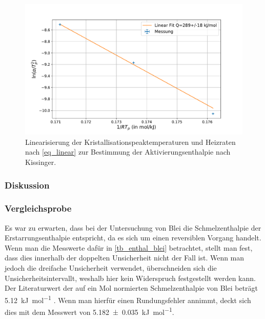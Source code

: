 \documentclass[
	a4paper,
	12pt,
	pagesize,
	ngerman
]{scrartcl}
\begin{document}
\begin{figure}[H]
			\includegraphics[width=\linewidth]{img/Kalorimetrie_kissinger.pdf}
			\caption{
			Linearisierung der Kristallisationspeaktemperaturen und Heizraten nach \cref{eq_linear} zur Bestimmung der Aktivierungsenthalpie nach Kissinger.
			}
			\label{fig_thermo_kissinger}
		\end{figure}


	\subsubsection{Diskussion}

	\subsubsection*{Vergleichsprobe}
	Es war zu erwarten, dass bei der Untersuchung von Blei die Schmelzenthalpie der Erstarrungsenthalpie entspricht, da es sich um einen reversiblen Vorgang handelt.
	Wenn man die Messwerte dafür in \cref{tb_enthal_blei} betrachtet, stellt man fest, dass dies innerhalb der doppelten Unsicherheit nicht der Fall ist.
	Wenn man jedoch die dreifache Unsicherheit verwendet, überschneiden sich die Unsicherheitsintervallt, weshalb hier kein Widerspruch festgestellt werden kann.
	Der Literaturwert der auf ein Mol normierten Schmelzenthalpie von Blei beträgt \SI{5.12}{\kilo \joule \per \mol} \cite{blei_enthalpie}.
	Wenn man hierfür einen Rundungsfehler annimmt, deckt sich dies mit dem Messwert von \SI{5,182 \pm 0,035}{\kilo \joule \per \mol}.
\end{document}
